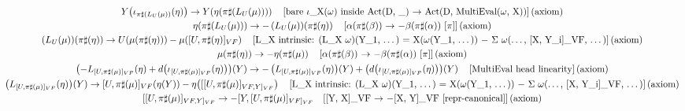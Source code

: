 \documentclass[11pt]{article}
\begin{document}
{\begin{gather*}
Y\!\left(\iota_{\pi\sharp(L_U(\mu))}\!\left(\eta\right)\right) \to Y\!\left(\eta\!\left(\pi\sharp\!\left(L_U\!\left(\mu\right)\right)\right)\right) \quad \text{[bare \ensuremath{\iota}\_X(\ensuremath{\omega}) inside Act(D, \_) \ensuremath{\to} Act(D, MultiEval(\ensuremath{\omega}, X))]\,(axiom)} \\
\eta\!\left(\pi\sharp\!\left(L_U\!\left(\mu\right)\right)\right) \to -\left(L_U\!\left(\mu\right)\right)\!\left(\pi\sharp\!\left(\eta\right)\right) \quad \text{[\ensuremath{\alpha}(\ensuremath{\pi}\ensuremath{\sharp}(\ensuremath{\beta})) \ensuremath{\to} \ensuremath{-}\ensuremath{\beta}(\ensuremath{\pi}\ensuremath{\sharp}(\ensuremath{\alpha})) [\ensuremath{\pi}]]\,(axiom)} \\
\left(L_U\!\left(\mu\right)\right)\!\left(\pi\sharp\!\left(\eta\right)\right) \to U\!\left(\mu\!\left(\pi\sharp\!\left(\eta\right)\right)\right) - \mu\!\left([U,\pi\sharp(\eta)]_{VF}\right) \quad \text{[L\_X intrinsic: (L\_X \ensuremath{\omega})(Y\_1, \ensuremath{\dots}) = X(\ensuremath{\omega}(Y\_1, \ensuremath{\dots})) \ensuremath{-} \ensuremath{\Sigma} \ensuremath{\omega}(\ensuremath{\dots}, [X, Y\_i]\_VF, \ensuremath{\dots})]\,(axiom)} \\
\mu\!\left(\pi\sharp\!\left(\eta\right)\right) \to -\eta\!\left(\pi\sharp\!\left(\mu\right)\right) \quad \text{[\ensuremath{\alpha}(\ensuremath{\pi}\ensuremath{\sharp}(\ensuremath{\beta})) \ensuremath{\to} \ensuremath{-}\ensuremath{\beta}(\ensuremath{\pi}\ensuremath{\sharp}(\ensuremath{\alpha})) [\ensuremath{\pi}]]\,(axiom)} \\
\left(-L_{[U,\pi\sharp(\mu)]_{VF}}\!\left(\eta\right) + d\!\left(\iota_{[U,\pi\sharp(\mu)]_{VF}}\!\left(\eta\right)\right)\right)\!\left(Y\right) \to -\left(L_{[U,\pi\sharp(\mu)]_{VF}}\!\left(\eta\right)\right)\!\left(Y\right) + \left(d\!\left(\iota_{[U,\pi\sharp(\mu)]_{VF}}\!\left(\eta\right)\right)\right)\!\left(Y\right) \quad \text{[MultiEval head linearity]\,(axiom)} \\
\left(L_{[U,\pi\sharp(\mu)]_{VF}}\!\left(\eta\right)\right)\!\left(Y\right) \to [U,\pi\sharp(\mu)]_{VF}\!\left(\eta\!\left(Y\right)\right) - \eta\!\left([[U,\pi\sharp(\mu)]_{VF,Y]_{VF}}\right) \quad \text{[L\_X intrinsic: (L\_X \ensuremath{\omega})(Y\_1, \ensuremath{\dots}) = X(\ensuremath{\omega}(Y\_1, \ensuremath{\dots})) \ensuremath{-} \ensuremath{\Sigma} \ensuremath{\omega}(\ensuremath{\dots}, [X, Y\_i]\_VF, \ensuremath{\dots})]\,(axiom)} \\
[[U,\pi\sharp(\mu)]_{VF,Y]_{VF}} \to -[Y,[U,\pi\sharp(\mu)]_{VF]_{VF}} \quad \text{[[Y, X]\_VF \ensuremath{\to} \ensuremath{-}[X, Y]\_VF  [repr-canonical]]\,(axiom)} \\

\end{gather*}}
\end{document}
